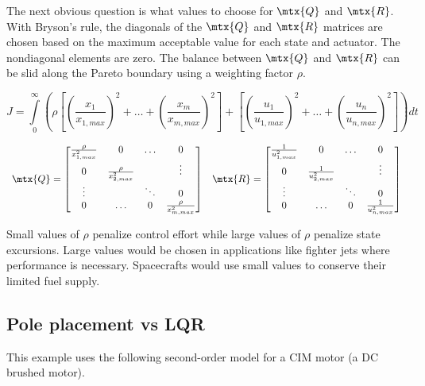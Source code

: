 The next obvious question is what values to choose for $\mtx{Q}$ and $\mtx{R}$.
With Bryson's rule, the diagonals of the $\mtx{Q}$ and $\mtx{R}$ matrices are
chosen based on the maximum acceptable value for each \gls{state} and actuator.
The nondiagonal elements are zero. The balance between $\mtx{Q}$ and $\mtx{R}$
can be slid along the Pareto boundary using a weighting factor $\rho$.

\begin{equation*}
  J = \int\limits_0^\infty \left(\rho \left[
    \left(\frac{x_1}{x_{1,max}}\right)^2 + \ldots +
    \left(\frac{x_m}{x_{m,max}}\right)^2\right] + \left[
    \left(\frac{u_1}{u_{1,max}}\right)^2 + \ldots +
    \left(\frac{u_n}{u_{n,max}}\right)^2\right]\right) dt
\end{equation*}

\begin{equation*}
  \begin{array}{cc}
    \mtx{Q} = \begin{bmatrix}
      \frac{\rho}{x_{1,max}^2} & 0 & \ldots & 0 \\
      0 & \frac{\rho}{x_{2,max}^2} & & \vdots \\
      \vdots & & \ddots & 0 \\
      0 & \ldots & 0 & \frac{\rho}{x_{m,max}^2}
    \end{bmatrix} &
    \mtx{R} = \begin{bmatrix}
      \frac{1}{u_{1,max}^2} & 0 & \ldots & 0 \\
      0 & \frac{1}{u_{2,max}^2} & & \vdots \\
      \vdots & & \ddots & 0 \\
      0 & \ldots & 0 & \frac{1}{u_{n,max}^2}
    \end{bmatrix}
  \end{array}
\end{equation*}

Small values of $\rho$ penalize \gls{control effort} while large values of
$\rho$ penalize \gls{state} excursions. Large values would be chosen in
applications like fighter jets where performance is necessary. Spacecrafts would
use small values to conserve their limited fuel supply.

\subsection{Pole placement vs LQR}

This example uses the following second-order \gls{model} for a CIM motor (a DC
brushed motor).

